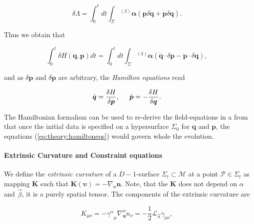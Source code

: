 {    \begin{equation}
        \delta\Lambda = \int_{0}^{t}dt\int_{\Sigma}{^{(3)}\boldsymbol{\alpha}}(\boldsymbol{p}\delta\dot{\boldsymbol{q}} + \dot{\boldsymbol{p}}\delta\boldsymbol{q}).
    \end{equation}
    
    Thus we obtain that 
    
    \begin{equation}
        \int_{0}^{t} \delta H(\boldsymbol{q},\boldsymbol{p})dt =   \int_{0}^{t}dt\int_{\Sigma}{^{(3)}\boldsymbol{\alpha}}(\dot{\boldsymbol{q}}\cdot\delta\boldsymbol{p}-\dot{\boldsymbol{p}}\cdot\delta\boldsymbol{q}),
    \end{equation}
    
    and as $\delta\boldsymbol{p}$ and $\delta\boldsymbol{p}$ are arbitrary, the \textit{Hamilton equations} read
    
    \begin{equation}
        \dot{\boldsymbol{q}}=\frac{\delta H}{\delta\boldsymbol{p}}, \hspace{5mm} \dot{\boldsymbol{p}} = -\frac{\delta H}{\delta\boldsymbol{q}}.
    \label{eq:theory:hamiltoneqs}
    \end{equation}
    
    The Hamiltonian formalism can be used to re-derive the field-equations in a from that once the initial data is specified on a hypersurface $\Sigma_0$ for $\boldsymbol{q}$ and $\boldsymbol{p}$, the equations (\ref{eq:theory:hamiltoneqs}) would govern whole the evolution.
    
    
    \paragraph{Extrinsic Curvature and Constraint equations}
    
    
    We define the \textit{extrinsic curvature} of a $D-1$-surface $\Sigma_t\subset\mathcal{M}$ at a point $\mathcal{P}\in\Sigma_t$ as mapping $\boldsymbol{K}$ such that $\boldsymbol{K}(\boldsymbol{\upsilon})=-\nabla_{\boldsymbol{\upsilon}}\boldsymbol{n}$. 
    Note, that the $\boldsymbol{K}$ does not depend on $\alpha$ and $\vec{\beta}$, it is a purely spatial tensor. 
    The components of the extrinsic curvature are 
    
    \begin{equation}
        K_{\mu\nu} = -{\gamma^{\alpha}}_{\mu}\nabla_{\boldsymbol{u}}^{\alpha} n_{\nu} = -\frac{1}{2}\mathcal{L}_{\vec{n}}\gamma_{\mu\nu},
    \label{eq:theory:extrcurvdef}
    \end{equation}
    
}
